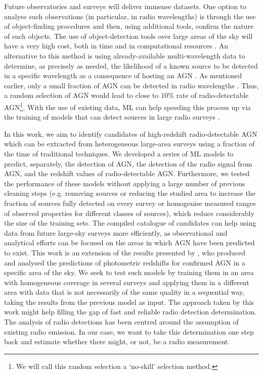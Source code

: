 \documentclass{aa}
\begin{document}
Future observatories and surveys will deliver immense datasets. One option to analyse such observations (in particular, in radio wavelengths) is through the use of object-finding procedures \citep[e.g.][]{1996A&AS..117..393B, 2020ASPC..527..461B, 2012MNRAS.425..979H, 2015ascl.soft02007M, 2018A&C....23...92C} and then, using additional tools, confirm the nature of such objects. The use of object-detection tools over large areas of the sky will have a very high cost, both in time and in computational resources \citep{2019MNRAS.484.2793V}. An alternative to this method is using already-available multi-wavelength data to determine, as precisely as needed, the likelihood of a known source to be detected in a specific wavelength as a consequence of hosting an AGN \citep[see, for instance,][]{2022arXiv221201915P}. As mentioned earlier, only a small fraction of AGN can be detected in radio wavelengths \citep[radio-loud AGN\textbf{;}][]{1993MNRAS.263..461P, 2019A&A...622A..11G, 2021MNRAS.506.5888M, 2022A&A...668A..27G, 2023MNRAS.tmp.1261B}. Thus, a random selection of AGN would lead to close to $10\%$ rate of radio-detectable AGN\footnote{We will call this random selection a `no-skill' selection method.}. With the use of existing data, ML can help speeding this process up via the training of models that can detect sources in large radio surveys \citep[see, for an example of the efforts done to achieve this goal,][]{2015PASA...32...37H, 2021MNRAS.500.3821B}.

In this work, we aim to identify candidates of high-redshift radio-detectable AGN which can be extracted from heterogeneous large-area surveys using a fraction of the time of traditional techniques. We developed a series of ML models to predict, separately, the detection of AGN, the detection of the radio signal from AGN, and the redshift values of radio-detectable AGN. Furthermore, we tested the performance of these models without applying a large number of previous cleaning steps (e.g. removing sources or reducing the studied area to increase the fraction of sources fully detected on every survey or homogenise measured ranges of observed properties for different classes of sources), which reduce considerably the size of the training sets. The compiled catalogue of candidates can help using data from future large-sky surveys more efficiently, as observational and analytical efforts can be focused on the areas in which AGN have been predicted to exist. This work is an extension of the results presented by \citet{2021Galax...9...86C}, who produced and analysed the predictions of photometric redshifts for confirmed AGN in a specific area of the sky. We seek to test such models by training them in an area with homogeneous coverage in several surveys and applying them in a different area with data that is not necessarily of the same quality in a sequential way, taking the results from the previous model as input. The approach taken by this work might help filling the gap of fast and reliable radio detection determination. The analysis of radio detections has been centred around the assumption of existing radio emission. In our case, we want to take this determination one step back and estimate whether there might, or not, be a radio measurement.
\end{document}
